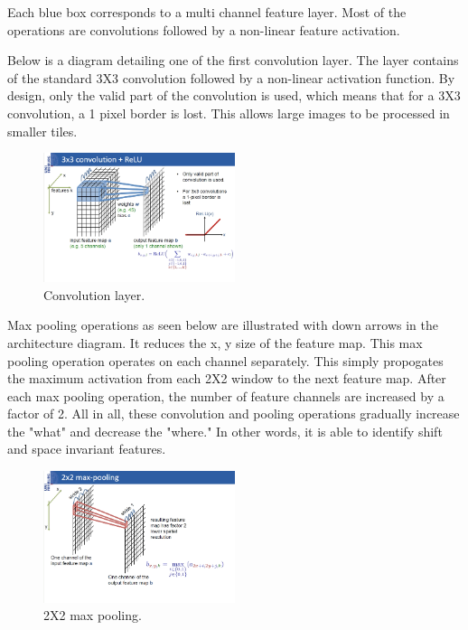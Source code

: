 \documentclass[letterpaper]{article}
\begin{document}
Each blue box corresponds to a multi channel feature layer. Most of the operations are convolutions followed by a non-linear feature activation. 

Below is a diagram detailing one of the first convolution layer. The layer contains of the standard 3X3 convolution followed by a non-linear activation function. By design, only the valid part of the convolution is used, which means that for a 3X3 convolution, a 1 pixel border is lost. This allows large images to be processed in smaller tiles. 	

 \begin{figure}[H]
  \centerline{\includegraphics[width=0.5\textwidth]{Images/UNET1.png}}
  \caption{Convolution layer.}
  \label{fig:unet1}
\end{figure}

Max pooling operations as seen below are illustrated with down arrows in the architecture diagram. It reduces the x, y size of the feature map. This max pooling operation operates on each channel separately.  This simply propogates the maximum activation from each 2X2 window to the next feature map. After each max pooling operation, the number of feature channels are increased by a factor of 2. All in all, these convolution and pooling operations gradually increase the "what" and decrease the "where." In other words, it is able to identify shift and space invariant features. 


 \begin{figure}[H]
  \centerline{\includegraphics[width=0.5\textwidth]{Images/UNET2.png}}
  \caption{2X2 max pooling.}
  \label{fig:unet2}
\end{figure}
\end{document}

